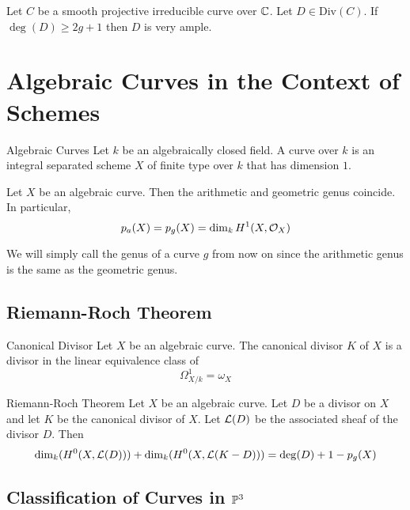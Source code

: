 \documentclass[a4paper]{article}
\begin{document}
\begin{crl}{}{} Let $C$ be a smooth projective irreducible curve over $\mathbb{C}$. Let $D\in\text{Div}(C)$. If $\deg(D)\geq 2g+1$ then $D$ is very ample. 
\end{crl}


\pagebreak
\section{Algebraic Curves in the Context of Schemes}
\begin{defn}{Algebraic Curves}{} Let $k$ be an algebraically closed field. A curve over $k$ is an integral separated scheme $X$ of finite type over $k$ that has dimension $1$. 
\end{defn}

\begin{prp}{}{} Let $X$ be an algebraic curve. Then the arithmetic and geometric genus coincide. In particular, $$p_a(X)=p_g(X)=\dim_kH^1(X,\mathcal{O}_X)$$
\end{prp}

We will simply call the genus of a curve $g$ from now on since the arithmetic genus is the same as the geometric genus. 

\subsection{Riemann-Roch Theorem}
\begin{defn}{Canonical Divisor}{} Let $X$ be an algebraic curve. The canonical divisor $K$ of $X$ is a divisor in the linear equivalence class of $$\Omega_{X/k}^1=\omega_X$$
\end{defn}

\begin{thm}{Riemann-Roch Theorem}{} Let $X$ be an algebraic curve. Let $D$ be a divisor on $X$ and let $K$ be the canonical divisor of $X$. Let $\mathcal{L}(D)$ be the associated sheaf of the divisor $D$. Then $$\dim_k(H^0(X,\mathcal{L}(D)))+\dim_k(H^0(X,\mathcal{L}(K-D)))=\deg(D)+1-p_g(X)$$
\end{thm}

\subsection{Classification of Curves in $\mathbb{P}^3$}
\end{document}
